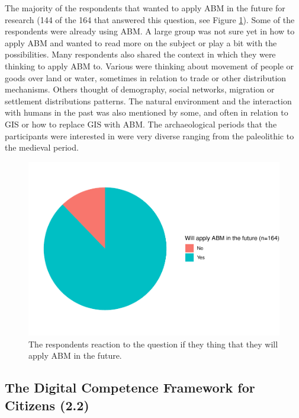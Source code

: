 \documentclass[
]{article}
\begin{document}
The majority of the respondents that wanted to apply ABM in the future for research (144 of the 164 that answered this question, see Figure \ref{fig:future-abm}). Some of the respondents were already using ABM. A large group was not sure yet in how to apply ABM and wanted to read more on the subject or play a bit with the possibilities. Many respondents also shared the context in which they were thinking to apply ABM to. Various were thinking about movement of people or goods over land or water, sometimes in relation to trade or other distribution mechanisms. Others thought of demography, social networks, migration or settlement distributions patterns. The natural environment and the interaction with humans in the past was also mentioned by some, and often in relation to GIS or how to replace GIS with ABM. The archaeological periods that the participants were interested in were very diverse ranging from the paleolithic to the medieval period.

\begin{figure}
\includegraphics[height=0.5\textheight]{paper_files/figure-latex/future-abm-1} \caption{The respondents reaction to the question if they thing that they will apply ABM in the future.}\label{fig:future-abm}
\end{figure}

\hypertarget{the-digital-competence-framework-for-citizens-2.2}{%
\subsection{The Digital Competence Framework for Citizens (2.2)}\label{the-digital-competence-framework-for-citizens-2.2}}
\end{document}
